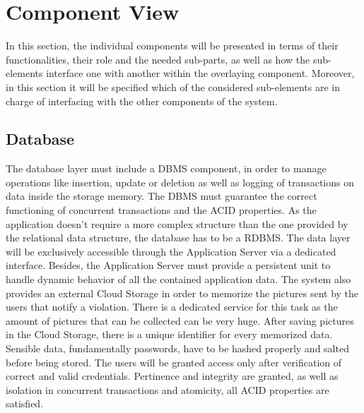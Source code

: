 \section{Component View}
In this section, the individual components will be presented in terms of their functionalities, their role and the 
needed sub-parts, as well as how the sub-elements interface one with another within the overlaying component. Moreover, 
in this section it will be specified which of the considered sub-elements are in charge of interfacing with the other 
components of the system.

\subsection{Database}
The database layer must include a DBMS component, in order to manage operations like insertion, update or deletion as 
well as logging of transactions on data inside the storage memory. The DBMS must guarantee the correct functioning of 
concurrent transactions and the ACID properties. As the application doesn’t require a more complex structure than the 
one provided by the relational data structure, the database has to be a RDBMS. The data layer will be exclusively 
accessible through the Application Server via a dedicated interface. Besides, the Application Server must provide a 
persistent unit to handle dynamic behavior of all the contained application data. 
\newline The system also provides an external Cloud Storage in order to memorize the pictures sent by the users that 
notify a violation. There is a dedicated service for this task as the amount of pictures that can be collected can be 
very huge. After saving pictures in the Cloud Storage, there is a unique identifier for every memorized data.
\newline Sensible data, fundamentally passwords, have to be hashed properly and salted before being stored. 
The users will be granted access only after verification of correct and valid credentials.
\newline Pertinence and integrity are granted, as well as isolation in concurrent transactions and atomicity, all ACID properties 
are satisfied.

